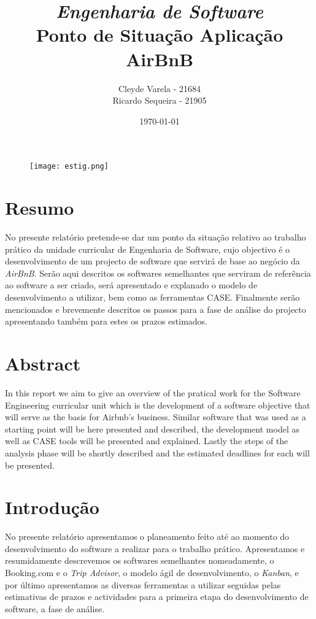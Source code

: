 \documentclass[a4paper]{article}
\title{\textit{Engenharia de Software}\\Ponto de Situação Aplicação AirBnB} %
\author{Cleyde Varela - 21684 \\ Ricardo Sequeira - 21905} %
\date{\today}
\begin{document}
\maketitle
\begin{figure}[!t]
    \texttt{[image: estig.png]}
\end{figure}

\newpage
\section{Resumo}
No presente relatório pretende-se dar um ponto da situação relativo ao trabalho prático da unidade curricular de Engenharia de Software, cujo objectivo é o desenvolvimento de um projecto de software que servirá de base ao negócio da \textit{AirBnB}.
Serão aqui descritos os softwares semelhantes que serviram de referência ao software a ser criado, será apresentado e explanado o modelo de desenvolvimento a utilizar, bem como as ferramentas CASE. Finalmente serão mencionados e brevemente descritos os passos para a fase de análise do projecto apresentando também para estes os prazos estimados.
\newpage

\section{Abstract}
In this report we aim to give an overview of the pratical work for the Software Engineering curricular unit which is the development of a software objective that will serve as the basis for Airbnb's business. 
Similar software that was used as a starting point will be here presented and described, the development model as well as CASE tools will be presented and explained. Lastly the steps of the analysis phase will be shortly described and the estimated deadlines for each will be presented.

\newpage
\tableofcontents
\newpage

\section{Introdução}
No presente relatório apresentamos o planeamento feito até ao momento do desenvolvimento do software a realizar para o trabalho prático. Apresentamos e resumidamente descrevemos os softwares semelhantes nomeadamente, o Booking.com e o \textit{Trip Advisor}, o modelo ágil de desenvolvimento, o \textit{Kanban}, e por último apresentamos as diversas ferramentas a utilizar seguidas pelas estimativas de prazos e actividades para a primeira etapa do desenvolvimento de software, a fase de análise.
\newpage
\end{document}
